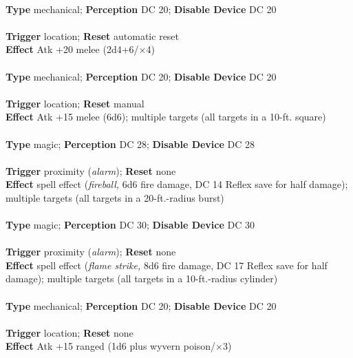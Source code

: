 \\
\textbf{Type }mechanical; \textbf{Perception} DC 20; \textbf{Disable Device} DC 20\\
\\
\textbf{Trigger} location; \textbf{Reset} automatic reset\\
\textbf{Effect }Atk +20 melee (2d4+6/×4)\\

\\
\textbf{Type }mechanical; \textbf{Perception} DC 20; \textbf{Disable Device} DC 20\\
\\
\textbf{Trigger} location; \textbf{Reset} manual\\
\textbf{Effect }Atk +15 melee (6d6); multiple targets (all targets in a 10-ft. square)\\

\\
\textbf{Type }magic; \textbf{Perception} DC 28; \textbf{Disable Device} DC 28\\
\\
\textbf{Trigger} proximity (\textit{alarm}); \textbf{Reset} none\\
\textbf{Effect }spell effect (\textit{fireball, }6d6 fire damage, DC 14 Reflex save for half damage); multiple targets (all targets in a 20-ft.-radius burst)\\

\\
\textbf{Type }magic; \textbf{Perception} DC 30; \textbf{Disable Device} DC 30\\
\\
\textbf{Trigger} proximity (\textit{alarm}); \textbf{Reset} none\\
\textbf{Effect }spell effect (\textit{flame strike, }8d6 fire damage, DC 17 Reflex save for half damage); multiple targets (all targets in a 10-ft.-radius cylinder)\\

\\
\textbf{Type }mechanical; \textbf{Perception} DC 20; \textbf{Disable Device} DC 20\\
\\
\textbf{Trigger} location; \textbf{Reset} none\\
\textbf{Effect }Atk +15 ranged (1d6 plus wyvern poison/×3)\\

